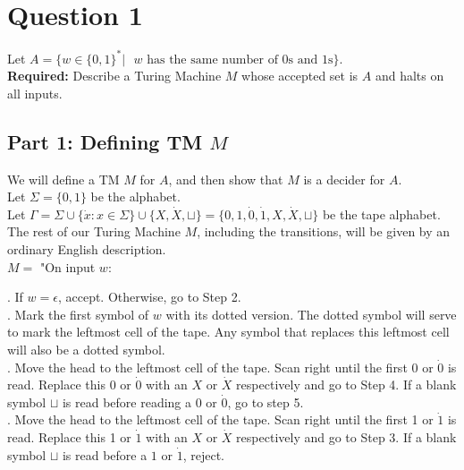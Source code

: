 \documentclass[12pt]{article}
\begin{document}

\setlength\parindent{0pt}

\section*{Question 1}

Let $A = \{w \in \{0,1\}^* | \text{ $w$ has the same number of 0s and 1s}\}$. \\

\textbf{Required:} Describe a Turing Machine $M$ whose accepted set is $A$ and halts on all inputs. 

\subsection*{Part 1: Defining TM $M$}

We will define a TM $M$ for $A$, and then show that $M$ is a decider for $A$. \\

Let $\Sigma = \{0,1\}$ be the alphabet. \\

Let $\Gamma = \Sigma \cup \{\Dot{x} : x \in \Sigma\} \cup \{X, \Dot{X}, \sqcup\} = \{0,1,\Dot{0},\Dot{1}, X, \Dot{X}, \sqcup\}$ be the tape alphabet. \\

The rest of our Turing Machine $M$, including the transitions, will be given by an ordinary English description. \\

$M = $ "On input $w$: \\

\setlength\parindent{15pt}

. If $w = \epsilon$, accept. Otherwise, go to Step 2. \\

. Mark the first symbol of $w$ with its dotted version. The dotted symbol will serve to mark the leftmost cell of the tape. Any symbol that replaces this leftmost cell will also be a dotted symbol. \\

. Move the head to the leftmost cell of the tape. Scan right until the first 0 or $\Dot{0}$ is read. Replace this $0$ or $\Dot{0}$ with an $X$ or $\Dot{X}$ respectively and go to Step 4. If a blank symbol $\sqcup$ is read before reading a $0$ or $\Dot{0}$, go to step 5. \\

. Move the head to the leftmost cell of the tape. Scan right until the first 1 or $\Dot{1}$ is read. Replace this 1 or $\Dot{1}$ with an $X$ or $\Dot{X}$ respectively and go to Step 3. If a blank symbol $\sqcup$ is read before a $1$ or $\Dot{1}$, reject. \\
\end{document}
